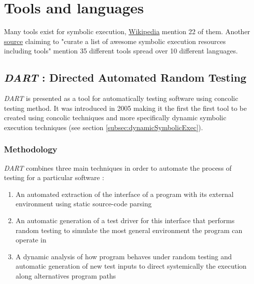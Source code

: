 \documentclass[11pt]{article}
\begin{document}
  \section{Tools and languages}
  	Many tools exist for symbolic execution, \href{https://en.wikipedia.org/wiki/Symbolic_execution\#Tools}{Wikipedia} mention 22 of them. Another \href{https://github.com/ksluckow/awesome-symbolic-execution\#tools}{source} claiming to "curate a list of awesome symbolic execution resources including tools" mention 35 different tools spread over 10 different languages.\\ %
  	


    \subsection{\emph{DART} : Directed Automated Random Testing}
    \label{subsec:DART}
    	\emph{DART} is presented as a tool for automatically testing software using concolic testing method. It was introduced in 2005 making it the first the first tool to be created using concolic techniques and more specifically dynamic symbolic execution techniques (see section \ref{subsec:dynamicSymbolicExec}). \\

    	\subsubsection{Methodology}
	    	\emph{DART} combines three main techniques 	    	\cite{godefroid2005dart} in order to automate the process of testing for a particular software :
	    	\begin{enumerate}
	    		\item An automated extraction of the interface of a program with its external environment using static source-code parsing
	    		\item An automatic generation of a test driver for this interface that performs random testing to simulate the most general environment the program can operate in
	    		\item A dynamic analysis of how program behaves under random testing and automatic generation of new test inputs to direct systemically the execution along alternatives program paths
	    	\end{enumerate}
	    		    	
\end{document}
